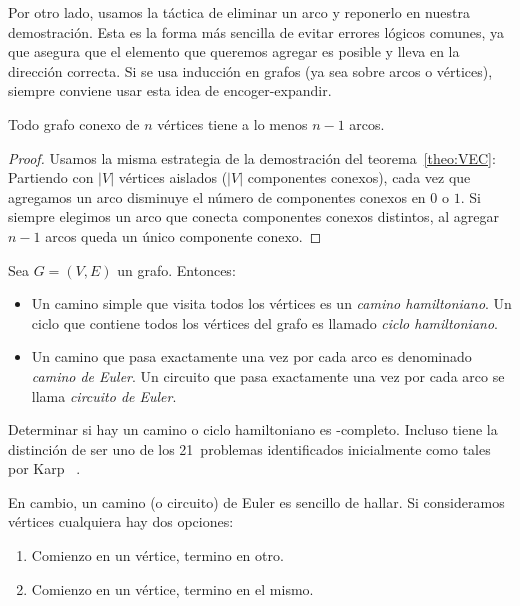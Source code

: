   Por otro lado,%
  usamos la táctica de eliminar un arco
  y reponerlo en nuestra demostración.
  Esta es la forma más sencilla de evitar errores lógicos comunes,
  ya que asegura que el elemento que queremos agregar es posible
  y lleva en la dirección correcta.
  Si se usa inducción en grafos
  (ya sea sobre arcos o vértices),
  siempre conviene usar esta idea de encoger-expandir.

  \begin{corollary}
    \label{cor:grafo-conexo-vertices-arcos}
    Todo grafo conexo de \(n\) vértices
    tiene a lo menos \(n - 1\) arcos.
  \end{corollary}
  \begin{proof}
    Usamos la misma estrategia
    de la demostración del teorema~\ref{theo:VEC}:
    Partiendo con \(\lvert V \rvert\) vértices aislados
    (\(\lvert V \rvert\) componentes conexos),
    cada vez que agregamos un arco
    disminuye el número de componentes conexos
    en \(0\) o \(1\).
    Si siempre elegimos un arco
    que conecta componentes conexos distintos,
    al agregar \(n - 1\) arcos queda un único componente conexo.
  \end{proof}

  \begin{definition}
    Sea \(G = (V, E)\) un grafo.
    Entonces:
    \begin{itemize}
      \item
	Un camino simple que visita todos los vértices
	es un \emph{camino hamiltoniano}.%
	Un ciclo que contiene todos los vértices del grafo
	es llamado \emph{ciclo hamiltoniano}.%
      \item
	Un camino que pasa exactamente una vez por cada arco
	es denominado \emph{camino de Euler}.%
	Un circuito que pasa exactamente una vez por cada arco
	se llama \emph{circuito de Euler}.%
    \end{itemize}
  \end{definition}

  Determinar si hay un camino o ciclo hamiltoniano
  es \NP\nobreakdash-completo.%
  Incluso tiene la distinción de ser uno de los 21~problemas
  identificados inicialmente como tales por Karp~%
    \cite{karp72:_reduc_among_combin_prob}.

  En cambio,
  un camino (o circuito) de Euler es sencillo de hallar.
  Si consideramos vértices cualquiera hay dos opciones:
  \begin{enumerate}
  \item
    Comienzo en un vértice,
    termino en otro.
  \item
    Comienzo en un vértice,
    termino en el mismo.
  \end{enumerate}

